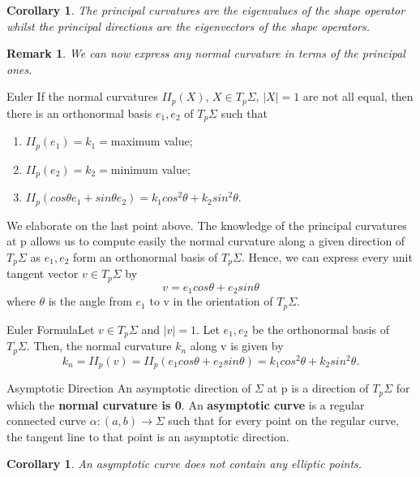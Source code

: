 \documentclass[twoside]{article}
\newtheorem{corollary}[theorem]{Corollary}
\newtheorem{remark}[theorem]{Remark}
\begin{document}
\begin{corollary}The principal curvatures are the eigenvalues of the shape operator whilst the principal directions are the eigenvectors of the shape operators.
\end{corollary}

\begin{remark}We can now express any normal curvature in terms of the principal ones.
\end{remark}


\begin{theorem_exam}{Euler}{} If the normal curvatures $II_p(X)$, $X \in T_p\Sigma$, $|X| = 1$ are not all equal, then there is an orthonormal basis $e_1, e_2$ of $T_p\Sigma$ such that 
\begin{enumerate}
\item $II_p(e_1) = k_1 = $maximum value;
\item $II_p(e_2) = k_2 = $minimum value;
\item $II_p(cos\theta e_1 + sin\theta e_2) = k_1cos^2\theta + k_2sin^2\theta.$
\end{enumerate}
\end{theorem_exam}

We elaborate on the last point above. The knowledge of the principal curvatures at p allows us to compute easily the normal curvature along a given direction of $T_p\Sigma$ as $e_1, e_2$ form an orthonormal basis of $T_p\Sigma.$ Hence, we can express every unit tangent vector $v \in T_p\Sigma$ by 
$$
v = e_1cos\theta + e_2sin\theta
$$
where $\theta$ is the angle from $e_1$ to v in the orientation of $T_p\Sigma.$
\begin{theorem_exam}{Euler Formula}{}Let $v \in T_p\Sigma$ and $|v| = 1.$ Let $e_1, e_2$ be the orthonormal basis of $T_p\Sigma.$ Then, the normal curvature $k_n$ along v is given by 
$$
k_n = II_p(v) = II_p(e_1cos\theta + e_2sin\theta) = k_1cos^2\theta + k_2sin^2\theta.
$$
\end{theorem_exam}


\begin{definition_exam}{Asymptotic Direction}{} An asymptotic direction of $\Sigma$ at p is a direction of $T_p\Sigma$ for which the \textbf{normal curvature is 0}. An \textbf{asymptotic curve} is a regular connected curve $\alpha: (a,b) \rightarrow \Sigma$ such that for every point on the regular curve, the tangent line to that point is an asymptotic direction.
\end{definition_exam}

\begin{corollary}An asymptotic curve does not contain any elliptic points.
\end{corollary}
\end{document}
